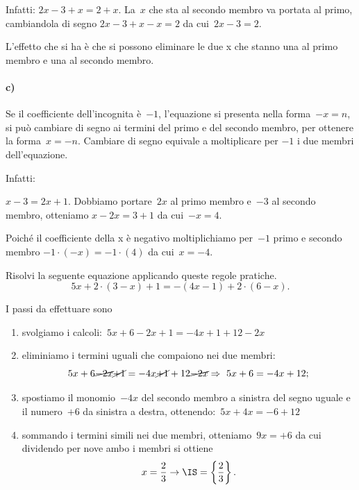 Infatti:
\(2x-3+x=2+x\). La~\(x\) che sta al secondo membro va portata al primo, cambiandola 
di segno
\(2x-3+x-x=2\) da cui~\(2x-3=2\).

L'effetto che si ha è che si possono eliminare le due
x che stanno una al primo membro e una al secondo membro.


\paragraph{c)} Se il coefficiente dell'incognita è~\(-1\), %
l'equazione si presenta nella forma~\(-x=n\), si
può cambiare di segno ai termini del primo e del secondo membro, per
ottenere la forma~\(x=-n\). Cambiare di segno equivale a moltiplicare per
\(-1\) i due membri dell'equazione.

Infatti:

\(x-3=2x+1\). Dobbiamo portare~\(2x\) al primo membro e~\(-3\) al secondo membro, 
otteniamo
\(x-2x=3+1\) da cui~\(-x=4\).

Poiché il coefficiente della x è negativo moltiplichiamo per~\(-1\)
primo e secondo membro
\(-1\cdot (-x)=-1\cdot (4)\) da cui~\(x=-4\).

\begin{problema}
 Risolvi la seguente equazione applicando queste regole pratiche.
 \[5x+2\cdot (3-x)+1=-(4x-1)+2\cdot (6-x).\]
\end{problema}

\begin{soluzione}
I passi da effettuare sono
\begin{enumerate}
 \item svolgiamo i calcoli:~\(5x+6-2x+1=-4x+1+12-2x\)
 \item eliminiamo i termini uguali che compaiono nei due membri:
 \[5x+6 \cancel{-2x}\cancel{+1}=-4x 
\cancel{+1}+12\cancel{-2x}\Rightarrow~5x+6=-4x+12;\]
 \item spostiamo il monomio~\(-4x\) del secondo membro a sinistra del segno uguale 
e il numero~\(+6\)
da sinistra a destra, ottenendo:~\(5x+4x=-6+12\)
\item sommando i termini simili nei due membri, otteniamo~\(9x=+6\) da cui 
dividendo per nove
 ambo i membri si ottiene
 \[x=\dfrac{2}{3}\to \IS =\left\{\dfrac{2}{3}\right\}.\]
 \end{enumerate}

\end{soluzione}

